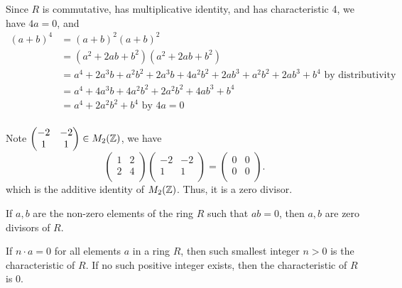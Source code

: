 \documentclass[12pt]{article}
\begin{document}
\begin{problem}[19.11]
Since $ R$ is commutative, has multiplicative identity, and has characteristic 4, we have  $ 4a=0$, and
 \begin{align*}
	 (a+b)^4 &= (a+b)^2 (a+b)^2 \\
		 &= (a^2+2ab+b^2)(a^2+2ab+b^2) \\
		 &= a^{4}+ 2a^3b+a^2 b^2 + 2a^3b+4a^2b^2+2ab^3+a^2b^2+2ab^3+b^{4} \text{ by distributivity} \\
		 &= a^{4} + 4a^3b+4a^2b^2+2a^2b^2+4ab^3+b^{4} \\
		 &= a^{4}+2a^2b^2 +b^4 \text{ by }4a=0 \\
\end{align*}
\end{problem}

\begin{problem}[19.14]
	Note $ \begin{pmatrix} -2&-2\\1&1\\ \end{pmatrix} \in M_2(\mathbb{Z})$, we have
	\[
		\begin{pmatrix} 1&2\\2&4\\ \end{pmatrix} \begin{pmatrix} -2&-2\\1&1\\ \end{pmatrix} = \begin{pmatrix} 0&0\\0&0\\ \end{pmatrix} 
	.\] 
	which is the additive identity of $ M_2(\mathbb{Z})$. Thus, it is a zero divisor.
\end{problem}

\begin{problem}[19.15]
If $ a,b$ are the non-zero elements of the ring  $ R$ such that $ ab=0$, then  $ a,b$ are zero divisors of  $ R$.
\end{problem}

\begin{problem}[19.16]
If $ n \cdot a=0$ for all elements $ a$ in a ring  $ R$, then such smallest integer  $ n>0$ is the characteristic of $ R$. If no such positive integer exists, then the characteristic of  $ R$ is 0.
\end{problem}
\end{document}
